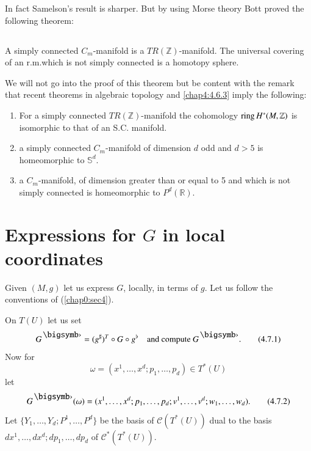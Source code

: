 \begin{remark*}
In fact Samelson's result is sharper. But by using Morse theory Bott
proved the following theorem:
\end{remark*}


\subsection{}\label{chap4:4.6.10}

\begin{theorem*}[\cite{6}: p.375]
A simply connected $C_{m}$-manifold is a
$TR(\mathbb{Z})$-mani\-fold. The universal covering of an r.m.\@ which
is not simply connected is a homotopy sphere.
\end{theorem*}

We \pageoriginale will not go into the proof of this theorem but be
content with the remark that recent theorems in algebraic topology and
\eqref{chap4:4.6.3} imply the following: 
\begin{enumerate}
\renewcommand{\labelenumi}{\theenumi)}
\item For a simply connected $TR(\mathbb{Z})$-manifold the cohomology
  $\ring H^{\ast}\unskip\break (M,\mathbb{Z})$ is isomorphic to that of an
  S.C. manifold.

\item a simply connected $C_{m}$-manifold of dimension $d$ odd and
  $d>5$ is homeomorphic to $\mathbb{S}^{d}$.

\item a $C_{m}$-manifold, of dimension greater than or equal to 5 and
  which is not simply connected is homeomorphic to $P^{d}(\mathbb{R})$.
\end{enumerate}

\section{Expressions for $G$ in local coordinates}\label{chap4:chap4-sec7}

Given $(M,g)$ let us express $G$, locally, in terms of $g$. Let us
follow the conventions of (\ref{chap0:sec4}).

On $T(U)$ let us set
\begin{equation*}
G^{\bigdot}=(g^{\sharp})^{T}\circ G\circ g^{\flat}\quad\text{and compute
} G^{\bigdot}.\tag{4.7.1}\label{chap4:4.7.1}
\end{equation*}
Now for
$$
\omega=(x^{1},\ldots,x^{d};p_{1},\ldots,p_{d})\in T^{\ast}(U)
$$
let
\begin{equation*}
G^{\bigdot}(\omega)=(x^{1},\ldots,x^{d};p_{1},\ldots,p_{d};v^{1},\ldots,v^{d};w_{1},\ldots,w_{d}).\tag{4.7.2}\label{chap4:4.7.2} 
\end{equation*}
Let $\{Y_{1},\ldots,Y_{d};P^{1},\ldots,P^{d}\}$ be the basis of
$\mathscr{C}(T^{\ast}(U))$ dual to the basis
$dx^{1},\ldots,dx^{d};dp_{1},\ldots,dp_{d}$ of
$\mathscr{C}^{\ast}(T^{\ast}(U))$.

